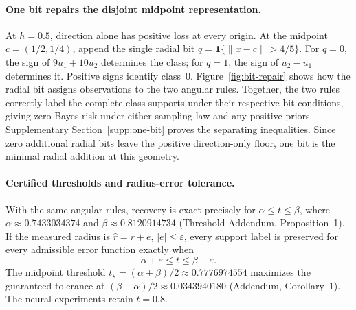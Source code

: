 \paragraph{One bit repairs the disjoint midpoint representation.}
At $h=0.5$, direction alone has positive loss at every origin. At the midpoint $c=(1/2,1/4)$, append the single radial bit $q=\mathbf1\{\|x-c\|>4/5\}$. For $q=0$, the sign of $9u_1+10u_2$ determines the class; for $q=1$, the sign of $u_2-u_1$ determines it. Positive signs identify class~0. Figure~\ref{fig:bit-repair} shows how the radial bit assigns observations to the two angular rules. Together, the two rules correctly label the complete class supports under their respective bit conditions, giving zero Bayes risk under either sampling law and any positive priors. Supplementary Section~\ref{supp:one-bit} proves the separating inequalities. Since zero additional radial bits leave the positive direction-only floor, one bit is the minimal radial addition at this geometry.

\paragraph{Certified thresholds and radius-error tolerance.}
With the same angular rules, recovery is exact precisely for $\alpha\leq t\leq\beta$, where $\alpha\approx0.7433034374$ and $\beta\approx0.8120914734$ (Threshold Addendum, Proposition~1). If the measured radius is $\widehat r=r+e$, $|e|\leq\varepsilon$, every support label is preserved for every admissible error function exactly when
\begin{equation}
\alpha+\varepsilon\leq t\leq\beta-\varepsilon.
\label{eq:radius-error}
\end{equation}
The midpoint threshold $t_\star=(\alpha+\beta)/2\approx0.7776974554$ maximizes the guaranteed tolerance at $(\beta-\alpha)/2\approx0.0343940180$ (Addendum, Corollary~1). The neural experiments retain $t=0.8$.
